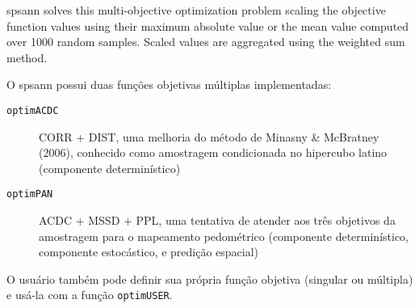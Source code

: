 spsann solves this multi-objective optimization problem scaling the objective function values using their maximum absolute value or the mean value computed over 1000 random samples. Scaled values are aggregated using the weighted sum method.

O spsann possui duas funções objetivas múltiplas implementadas:

\begin{description}
\item [\verb|optimACDC|] CORR + DIST, uma melhoria do método de Minasny & McBratney (2006), conhecido como amostragem condicionada no hipercubo latino (componente determinístico)
\item [\verb|optimPAN|] ACDC + MSSD + PPL, uma tentativa de atender aos três objetivos da amostragem para o mapeamento pedométrico (componente determinístico, componente estocástico, e predição espacial)
\end{description}

O usuário também pode definir sua própria função objetiva (singular ou múltipla) e usá-la com a função \verb|optimUSER|.